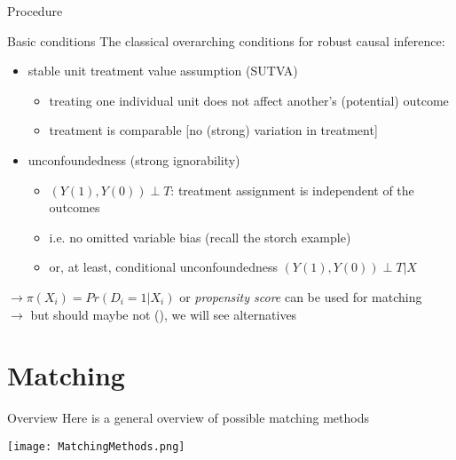 \documentclass[aspectratio=169]{beamer}
\begin{document}
		\begin{frame}{Procedure}
			\begin{center}
			\end{center}
		\end{frame}

		\begin{frame}{Basic conditions}
			The classical overarching conditions for robust causal inference:
			\\ \vspace*{.25cm}
			\begin{itemize}
				\item stable unit treatment value assumption (SUTVA)
				\begin{itemize}
					\item treating one individual unit does not affect another's (potential) outcome
					\item treatment is comparable [no (strong) variation in treatment]
				\end{itemize}
				\item<2-> unconfoundedness (strong ignorability)
				\begin{itemize}
					\item<2-> $(Y(1), Y(0)) \perp T$: treatment assignment is independent of the outcomes
					\item<2-> i.e. no omitted variable bias (recall the storch example)
					\item<2-> or, at least, conditional unconfoundedness  $(Y(1), Y(0)) \perp T {}|{} X$
				\end{itemize}
			\end{itemize}
			\vspace*{.25cm}  {$\rightarrow \pi(X_i) = Pr(D_i = 1 | X_i)$ or \textit{propensity score} can be used for matching}
			\\ \onslide<4> {$\rightarrow$ but should maybe not (\cite{King2019}), we will see alternatives }
		\end{frame}

\section{Matching}

		\begin{frame}{Overview}
			Here is a general overview of possible matching methods
			\\ \vspace*{.05cm}
			\begin{center}
				\texttt{[image: MatchingMethods.png]}
			\end{center}
		\end{frame}
\end{document}
